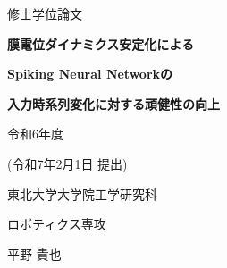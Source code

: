 \begin{titlepage}
    \begin{center}
        {\fontsize{24pt}{24pt}\selectfont  修士学位論文}
        \vspace{3cm}
  
        {\fontsize{20pt}{20pt}\selectfont \textbf{膜電位ダイナミクス安定化による}}
        \vspace{0.5cm}

        {\fontsize{20pt}{20pt}\selectfont \textbf{Spiking Neural Networkの}}
        \vspace{0.5cm}

        {\fontsize{20pt}{20pt}\selectfont \textbf{入力時系列変化に対する頑健性の向上}}
        \vspace{7cm}

        {\fontsize{18pt}{18pt}\selectfont 令和6年度} 
        \vspace{0.5cm}

        {\fontsize{18pt}{18pt}\selectfont (令和7年2月1日 提出)} 
        \vspace{3cm}

        {\fontsize{18pt}{18pt}\selectfont 東北大学大学院工学研究科}
        \vspace{0.5cm}

        {\fontsize{18pt}{18pt}\selectfont ロボティクス専攻}
        \vspace{1.0cm}

        {\fontsize{18pt}{18pt}\selectfont 平野 貴也}
    \end{center}
  \end{titlepage}
\cleardoublepage